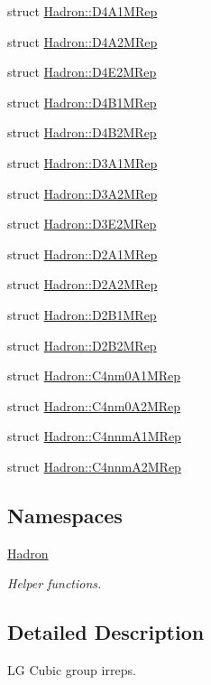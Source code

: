 \begin{DoxyCompactItemize}
\item 
struct \mbox{\hyperlink{structHadron_1_1D4A1MRep}{Hadron\+::\+D4\+A1\+M\+Rep}}
\item 
struct \mbox{\hyperlink{structHadron_1_1D4A2MRep}{Hadron\+::\+D4\+A2\+M\+Rep}}
\item 
struct \mbox{\hyperlink{structHadron_1_1D4E2MRep}{Hadron\+::\+D4\+E2\+M\+Rep}}
\item 
struct \mbox{\hyperlink{structHadron_1_1D4B1MRep}{Hadron\+::\+D4\+B1\+M\+Rep}}
\item 
struct \mbox{\hyperlink{structHadron_1_1D4B2MRep}{Hadron\+::\+D4\+B2\+M\+Rep}}
\item 
struct \mbox{\hyperlink{structHadron_1_1D3A1MRep}{Hadron\+::\+D3\+A1\+M\+Rep}}
\item 
struct \mbox{\hyperlink{structHadron_1_1D3A2MRep}{Hadron\+::\+D3\+A2\+M\+Rep}}
\item 
struct \mbox{\hyperlink{structHadron_1_1D3E2MRep}{Hadron\+::\+D3\+E2\+M\+Rep}}
\item 
struct \mbox{\hyperlink{structHadron_1_1D2A1MRep}{Hadron\+::\+D2\+A1\+M\+Rep}}
\item 
struct \mbox{\hyperlink{structHadron_1_1D2A2MRep}{Hadron\+::\+D2\+A2\+M\+Rep}}
\item 
struct \mbox{\hyperlink{structHadron_1_1D2B1MRep}{Hadron\+::\+D2\+B1\+M\+Rep}}
\item 
struct \mbox{\hyperlink{structHadron_1_1D2B2MRep}{Hadron\+::\+D2\+B2\+M\+Rep}}
\item 
struct \mbox{\hyperlink{structHadron_1_1C4nm0A1MRep}{Hadron\+::\+C4nm0\+A1\+M\+Rep}}
\item 
struct \mbox{\hyperlink{structHadron_1_1C4nm0A2MRep}{Hadron\+::\+C4nm0\+A2\+M\+Rep}}
\item 
struct \mbox{\hyperlink{structHadron_1_1C4nnmA1MRep}{Hadron\+::\+C4nnm\+A1\+M\+Rep}}
\item 
struct \mbox{\hyperlink{structHadron_1_1C4nnmA2MRep}{Hadron\+::\+C4nnm\+A2\+M\+Rep}}
\end{DoxyCompactItemize}
\subsection*{Namespaces}
\begin{DoxyCompactItemize}
\item 
 \mbox{\hyperlink{namespaceHadron}{Hadron}}
\begin{DoxyCompactList}\small\item\em Helper functions. \end{DoxyCompactList}\end{DoxyCompactItemize}


\subsection{Detailed Description}
LG Cubic group irreps. 

